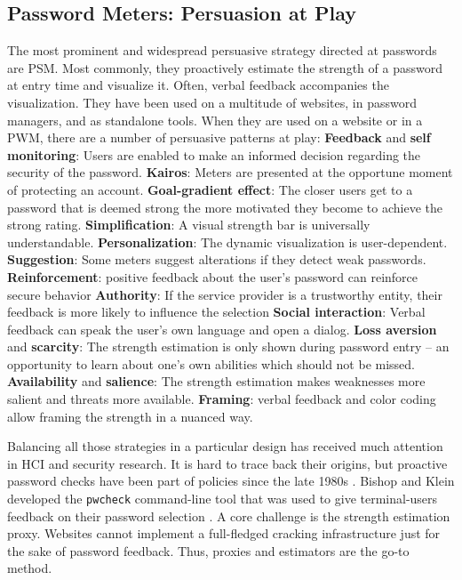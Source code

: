 	\subsection{Password Meters: Persuasion at Play}\label{sec:rw:password-meters}
	The most prominent and widespread persuasive strategy directed at passwords are \gls{PSM}. Most commonly, they  proactively estimate the strength of a password at entry time and visualize it. Often, verbal feedback accompanies the visualization. They have been used on a multitude of websites, in password managers, and as standalone tools. When they are used on a website or in a \gls{PWM}, there are a number of persuasive patterns at play:\newline
	\textbf{Feedback} and \textbf{self monitoring}: Users are enabled to make an informed decision regarding the security of the password.
	\textbf{Kairos}: Meters are presented at the opportune moment of protecting an account.
	\textbf{Goal-gradient effect}: The closer users get to a password that is deemed strong the more motivated they become to achieve the strong rating.
	\textbf{Simplification}: A visual strength bar is universally understandable.
	\textbf{Personalization}: The dynamic visualization is user-dependent.
	\textbf{Suggestion}: Some meters suggest alterations if they detect weak passwords.
	\textbf{Reinforcement}: positive feedback about the user's password can reinforce secure behavior
	\textbf{Authority}: If the service provider is a trustworthy entity, their feedback is more likely to influence the selection 
	\textbf{Social interaction}: Verbal feedback can speak the user's own language and open a dialog. 
	\textbf{Loss aversion} and \textbf{scarcity}: The strength estimation is only shown during password entry -- an opportunity to learn about one's own abilities which should not be missed. 
	\textbf{Availability} and \textbf{salience}: The strength estimation makes weaknesses more salient and threats more available. 
	\textbf{Framing}: verbal feedback and color coding allow framing the strength in a nuanced way.
	
	Balancing all those strategies in a particular design has received much attention in HCI and security research. It is hard to trace back their origins, but proactive password checks have been part of policies since the late 1980s \cite{Wheeler2016zxcvbn}. Bishop and Klein developed the \texttt{pwcheck} command-line tool that was used to give terminal-users feedback on their password selection \cite{Bishop1995ProactivePasswordChecking}. A core challenge is the strength estimation proxy. Websites cannot implement a full-fledged cracking infrastructure just for the sake of password feedback. Thus, proxies and estimators are the go-to method. 
	
